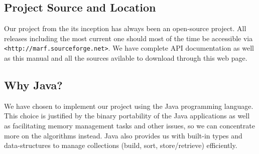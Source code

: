 \subsection{Project Source and Location}

Our project from the its inception has always been an open-source project.
All releases including the most current one should most of the time be
accessible via \verb+<http://marf.sourceforge.net>+.
We have complete API documentation as well as this manual and all the sources
avilable to download through this web page.

\subsection{Why Java?}

We have chosen to implement our project using the Java programming language. This
choice is justified by the binary portability of the Java applications as well as
facilitating memory management tasks and other issues, so we can concentrate more on
the algorithms instead. Java also provides
us with built-in types and data-structures to manage
collections (build, sort, store/retrieve) efficiently.

